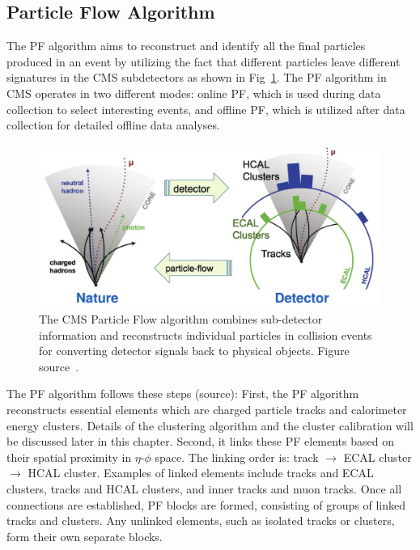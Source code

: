 \subsection{Particle Flow Algorithm}
\label{subsec:PF}
The PF algorithm aims to reconstruct and identify all the final particles produced in an event by utilizing the fact that different particles leave different signatures in the CMS subdetectors as shown in Fig~\ref{fig:PF_diagram}. %
The PF algorithm in CMS operates in two different modes: online PF, which is used during data collection to select interesting events, and offline PF, which is utilized after data collection for detailed offline data analyses. %

\begin{figure}[t!]
\centering
\includegraphics[width=0.99\textwidth]{figures/PF.png}
\caption[A diagram of the PF algorithm]{The CMS Particle Flow algorithm combines sub-detector information and reconstructs individual
particles in collision events for converting detector signals back to physical objects. Figure source~\cite{PF_diagram}.}
\label{fig:PF_diagram}
\end{figure}

The PF algorithm follows these steps (source):
First, the PF algorithm reconstructs essential elements which are charged particle tracks and calorimeter energy clusters.
Details of the clustering algorithm and the cluster calibration will be discussed later in this chapter.
Second, it links these PF elements based on their spatial proximity in $\eta$-$\phi$ space.
The linking order is: track $\rightarrow$ ECAL cluster $\rightarrow$ HCAL cluster.
Examples of linked elements include tracks and ECAL clusters, tracks and HCAL clusters, and inner tracks and muon tracks.
Once all connections are established, PF blocks are formed, consisting of groups of linked tracks and clusters.
Any unlinked elements, such as isolated tracks or clusters, form their own separate blocks.

